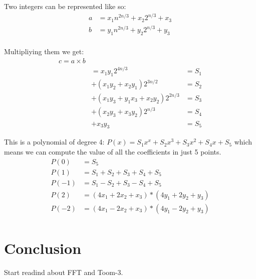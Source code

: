 \documentclass{article}
\begin{document}
Two integers can be represented like so:
\begin{align*}
    a &= x_1 n^{2n/3} + x_2 2^{n/3} + x_3 \\
    b &= y_1 n^{2n/3} + y_2 2^{n/3} + y_3 \\
\end{align*}

Multipliying them we get:
\begin{align*}
    c = a \times b&  \\
                  &= x_1 y_1 2^{4n/3} &= S_1 \\
                  &+ (x_1 y_2 + x_2 y_1) 2^{3n/2} &= S_2 \\
                  &+ (x_1 y_3 + y_1 x_3 + x_2 y_2) 2^{2n/3} &= S_3 \\
                  &+ (x_2 y_3 + x_3 y_2) 2^{n/3} &= S_4 \\
                  &+ x_3 y_3 &= S_5
\end{align*}

This is a polynomial of degree 4: $P(x) = S_1 x^x + S_2 x^3 + S_3 x^2 + S_4 x + S_5 $ which means we can compute the value of all the coefficients in just 5 points.
\begin{align*}
    P(0) &= S_5 \\
    P(1) &= S_1 + S_2 + S_3 + S_4 + S_5 \\
    P(-1) &= S_1 - S_2 + S_3 - S_4 + S_5 \\
    P(2) &= (4x_1 + 2x_2 + x_3) * (4y_1 + 2y_2 + y_3) \\
    P(-2) &= (4x_1 - 2x_2 + x_3) * (4y_1 - 2y_2 + y_3) \\
\end{align*}

\section{Conclusion}

Start readind about FFT and Toom-3.
\end{document}
